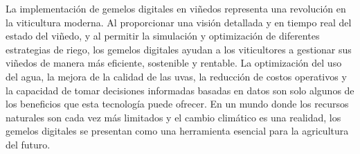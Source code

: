 \documentclass{article}
\begin{document}
La implementación de gemelos digitales en viñedos representa una
revolución en la viticultura moderna. Al proporcionar una visión
detallada y en tiempo real del estado del viñedo, y al permitir la
simulación y optimización de diferentes estrategias de riego, los
gemelos digitales ayudan a los viticultores a gestionar sus viñedos de
manera más eficiente, sostenible y rentable. La optimización del uso del
agua, la mejora de la calidad de las uvas, la reducción de costos
operativos y la capacidad de tomar decisiones informadas basadas en
datos son solo algunos de los beneficios que esta tecnología puede
ofrecer. En un mundo donde los recursos naturales son cada vez más
limitados y el cambio climático es una realidad, los gemelos digitales
se presentan como una herramienta esencial para la agricultura del
futuro.



\end{document}
